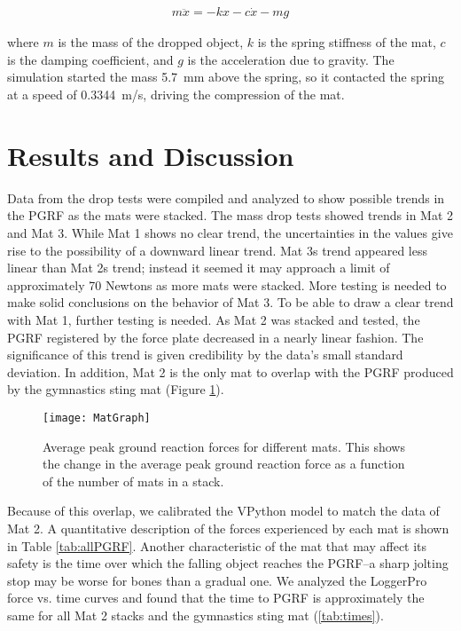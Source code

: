 \documentclass[12pt,aps,prb,preprint]{revtex4-1}   %
\begin{document}
\vspace{-8 mm}
\begin{eqnarray}
m\ddot x = -kx - c\dot x -mg
\end{eqnarray}

\noindent where $m$ is the mass of the dropped object, $k$ is the spring stiffness of the mat, $c$ is the damping coefficient, and $g$ is the acceleration due to gravity. The simulation started the mass 5.7~mm above the spring, so it contacted the spring at a speed of 0.3344~m/s, driving the compression of the mat.

\section{Results and Discussion}

Data from the drop tests were compiled and analyzed to show possible trends in the PGRF as the mats were stacked. The mass drop tests showed trends in Mat 2 and Mat 3. While Mat 1 shows no clear trend, the uncertainties in the values give rise to the possibility of a downward linear trend. Mat 3\textsc{}s trend appeared less linear than Mat 2\textsc{}s trend; instead it seemed it may approach a limit of approximately 70 Newtons as more mats were stacked. More testing is needed to make solid conclusions on the behavior of Mat 3. To be able to draw a clear trend with Mat 1, further testing is needed. As Mat 2 was stacked and tested, the PGRF registered by the force plate decreased in a nearly linear fashion. The significance of this trend is given credibility by the data’s small standard deviation. In addition, Mat 2 is the only mat to overlap with the PGRF produced by the gymnastics sting mat (Figure \ref{fig:trend}).

\begin{figure}[h]
	\centering
	\texttt{[image: MatGraph]}
	\caption{Average peak ground reaction forces for different mats. This shows the change in the average peak ground reaction force as a function of the number of mats in a stack.}
	\label{fig:trend}
\end{figure}
\vspace{-9 mm}
Because of this overlap, we calibrated the VPython model to match the data of Mat 2. A quantitative description of the forces experienced by each mat is shown in Table \ref{tab:allPGRF}. Another characteristic of the mat that may affect its safety is the time over which the falling object reaches the PGRF--a sharp jolting stop may be worse for bones than a gradual one. We analyzed the LoggerPro force vs. time curves and found that the time to PGRF is approximately the same for all Mat 2 stacks and the gymnastics sting mat (\ref{tab:times}).
\end{document}
